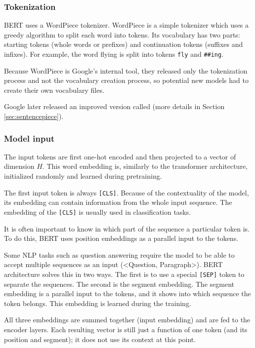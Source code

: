 \documentclass[
  printed, %
  color,   %
  table,   %
  oneside, %
  lof,     %
  lot,     %
]{fithesis3}
\begin{document}
\subsubsection{Tokenization}
BERT uses a WordPiece tokenizer\parencite[Section 4.1]{google-translation}. WordPiece is a simple tokenizer which uses a greedy algorithm to split each word into tokens. Its vocabulary has two parts: starting tokens (whole words or prefixes) and continuation tokens (suffixes and infixes). For example, the word flying is split into tokens \texttt{fly} and \texttt{\#\#ing}.

Because WordPiece is Google's internal tool, they released only the tokenization process and not the vocabulary creation process, so potential new models had to create their own vocabulary files.

Google later released an improved version called  (more details in Section \ref{sec:sentencepiece}). 


\subsubsection{Model input}
The input tokens are first one-hot encoded and then projected to a vector of dimension $H$. This word embedding is, similarly to the transformer architecture, initialized randomly and learned during pretraining.

The first input token is always \texttt{[CLS]}. Because of the contextuality of the model, its embedding can contain information from the whole input sequence. The embedding of the \texttt{[CLS]} is usually used in classification tasks.

It is often important to know in which part of the sequence a particular token is. To do this, BERT uses position embeddings as a parallel input to the tokens.

Some NLP tasks such as question answering require the model to be able to accept multiple sequences as an input (<Question, Paragraph>). BERT architecture solves this in two ways. The first is to use a special \texttt{[SEP]} token to separate the sequences. The second is the segment embedding. The segment embedding is a parallel input to the tokens, and it shows into which sequence the token belongs. This embedding is learned during the training. 

All three embeddings are summed together (input embedding) and are fed to the encoder layers. Each resulting vector is still just a function of one token (and its position and segment); it does not use its context at this point.
\end{document}
